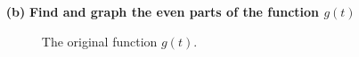 \documentclass[a4paper, 12pt]{article}
\begin{document}
\begin{itemize}
\begin{itemize}
\item[\textbf{(b)}]{\textbf{Find and graph the even parts of the function $g(t)$}}
\begin{figure}[h!]
\caption{\label{fig:2b_originalFunction} The original function $g(t)$.}
\end{figure}


\end{itemize}
\end{itemize}
\end{document}
